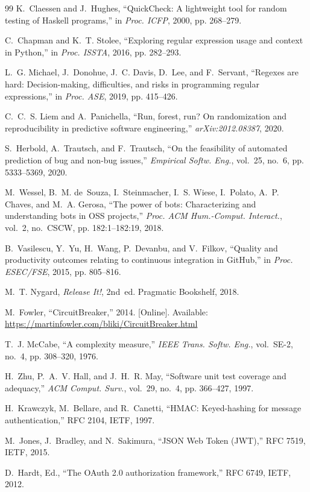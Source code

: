 \documentclass[journal]{IEEEtran}
\begin{document}
\begin{thebibliography}{99}
 K.~Claessen and J.~Hughes, ``QuickCheck: A lightweight tool for random testing of Haskell programs,'' in \emph{Proc. ICFP}, 2000, pp. 268--279.

 C.~Chapman and K.~T. Stolee, ``Exploring regular expression usage and context in Python,'' in \emph{Proc. ISSTA}, 2016, pp. 282--293.

 L.~G. Michael, J.~Donohue, J.~C. Davis, D.~Lee, and F.~Servant, ``Regexes are hard: Decision-making, difficulties, and risks in programming regular expressions,'' in \emph{Proc. ASE}, 2019, pp. 415--426.

 C.~C.~S. Liem and A.~Panichella, ``Run, forest, run? On randomization and reproducibility in predictive software engineering,'' \emph{arXiv:2012.08387}, 2020.

 S.~Herbold, A.~Trautsch, and F.~Trautsch, ``On the feasibility of automated prediction of bug and non-bug issues,'' \emph{Empirical Softw. Eng.}, vol.~25, no.~6, pp. 5333--5369, 2020.

 M.~Wessel, B.~M. de~Souza, I.~Steinmacher, I.~S. Wiese, I.~Polato, A.~P. Chaves, and M.~A. Gerosa, ``The power of bots: Characterizing and understanding bots in OSS projects,'' \emph{Proc. ACM Hum.-Comput. Interact.}, vol.~2, no.~CSCW, pp. 182:1--182:19, 2018.

 B.~Vasilescu, Y.~Yu, H.~Wang, P.~Devanbu, and V.~Filkov, ``Quality and productivity outcomes relating to continuous integration in GitHub,'' in \emph{Proc. ESEC/FSE}, 2015, pp. 805--816.

 M.~T. Nygard, \emph{Release It!}, 2nd~ed. Pragmatic Bookshelf, 2018.

 M.~Fowler, ``CircuitBreaker,'' 2014. [Online]. Available: \url{https://martinfowler.com/bliki/CircuitBreaker.html}

 T.~J. McCabe, ``A complexity measure,'' \emph{IEEE Trans. Softw. Eng.}, vol.~SE-2, no.~4, pp. 308--320, 1976.

 H.~Zhu, P.~A.~V. Hall, and J.~H.~R. May, ``Software unit test coverage and adequacy,'' \emph{ACM Comput. Surv.}, vol.~29, no.~4, pp. 366--427, 1997.

 H.~Krawczyk, M.~Bellare, and R.~Canetti, ``HMAC: Keyed-hashing for message authentication,'' RFC 2104, IETF, 1997.

 M.~Jones, J.~Bradley, and N.~Sakimura, ``JSON Web Token (JWT),'' RFC 7519, IETF, 2015.

 D.~Hardt, Ed., ``The OAuth 2.0 authorization framework,'' RFC 6749, IETF, 2012.

\end{thebibliography}
\end{document}
